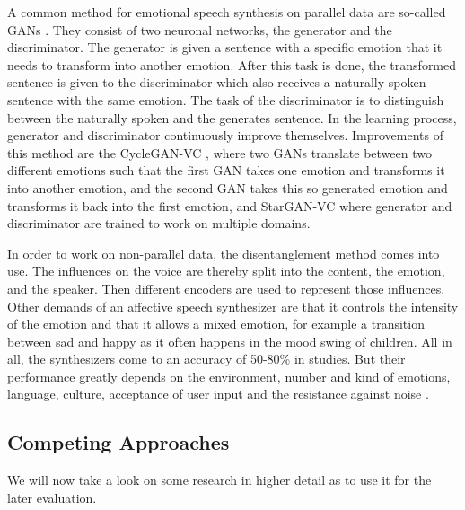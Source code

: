 \documentclass[11pt]{article}
\begin{document}
A common method for emotional speech synthesis on parallel data are so-called GANs \cite{goodfellow2020generative}. They consist of two neuronal networks, the generator and the discriminator. The generator is given a sentence with a specific emotion that it needs to transform into another emotion. After this task is done, the transformed sentence is given to the discriminator which also receives a naturally spoken sentence with the same emotion. The task of the discriminator is to distinguish between the naturally spoken and the generates sentence. In the learning process, generator and discriminator continuously improve themselves. Improvements of this method are the CycleGAN-VC \cite{kaneko2018cyclegan}, where two GANs translate between two different emotions such that the first GAN takes one emotion and transforms it into another emotion, and the second GAN takes this so generated emotion and transforms it back into the first emotion, and StarGAN-VC \cite{kameoka2018stargan} where generator and discriminator are trained to work on multiple domains.

In order to work on non-parallel data, the disentanglement method comes into use. The influences on the voice are thereby split into the content, the emotion, and the speaker. Then different encoders are used to represent those influences.
Other demands of an affective speech synthesizer are that it controls the intensity of the emotion and that it allows a mixed emotion, for example a transition between sad and happy as it often happens in the mood swing of children. All in all, the synthesizers come to an accuracy of 50-80\% in studies. But their performance greatly depends on the environment, number and kind of emotions, language, culture, acceptance of user input and the resistance against noise \cite{triantafyllopoulos_overview_2023}.


\subsection{Competing Approaches}
\label{competing_approaches}
We will now take a look on some research in higher detail as to use it for the later evaluation. 
\end{document}
